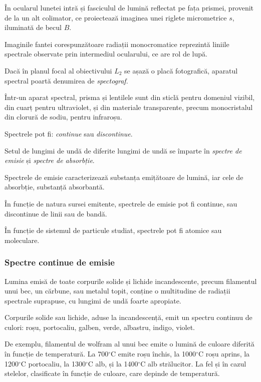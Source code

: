În ocularul lunetei intră și fasciculul de lumină reflectat pe fața prismei,
provenit de la un alt colimator, ce proiectează imaginea unei riglete
micrometrice $s$, iluminată de becul $B$.

Imaginile fantei corespunzătoare radiații monocromatice reprezintă liniile
spectrale observate prin intermediul ocularului, ce are rol de lupă.

Dacă în planul focal al obiectivului $L_2$ se așază o placă fotografică,
aparatul spectral poartă denumirea de \emph{spectograf}.

Într-un aparat spectral, prisma și lentilele sunt din sticlă pentru domeniul
vizibil, din cuarț pentru ultraviolet, și din materiale transparente, precum
monocristalul din clorură de sodiu, pentru infraroșu.

Spectrele pot fi: \emph{continue} sau \emph{discontinue}.

Setul de lungimi de undă de diferite lungimi de undă se împarte în
\emph{spectre de emisie} și \emph{spectre de absorbție}.

Spectrele de emisie caracterizează substanța emițătoare de lumină, iar cele de
absorbție, substanță absorbantă.

În funcție de natura sursei emitente, spectrele de emisie pot fi continue, sau discontinue de linii sau de bandă.

În funcție de sistemul de particule studiat, spectrele pot fi atomice sau moleculare.

\subsubsection{Spectre continue de emisie}

Lumina emisă de toate corpurile solide și lichide incandescente, precum
filamentul unui bec, un cărbune, sau metalul topit, conține o multitudine de
radiații spectrale suprapuse, cu lungimi de undă foarte apropiate.

Corpurile solide sau lichide, aduse la incandescență, emit un spectru continuu de culori: roșu, portocaliu, galben, verde, albastru, indigo, violet.

De exemplu, filamentul de wolfram al unui bec emite o lumină de culoare
diferită în funcție de temperatură. La 700$^\circ$C emite roșu închis, la
1000$^\circ$C roșu aprins, la 1200$^\circ$C portocaliu, la 1300$^\circ$C alb,
și la 1400$^\circ$C alb strălucitor. La fel și în cazul stelelor, clasificate
în funcție de culoare, care depinde de temperatură.

